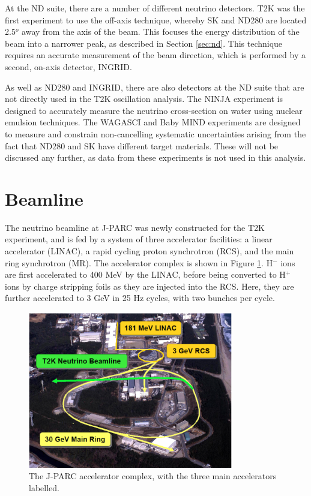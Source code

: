 At the ND suite, there are a number of different neutrino detectors. T2K was the first experiment to use the off-axis technique, whereby SK and ND280 are located 2.5$^o$ away from the axis of the beam. This focuses the energy distribution of the beam into a narrower peak, as described in Section \ref{sec:nd}. This technique requires an accurate measurement of the beam direction, which is performed by a second, on-axis detector, INGRID.

As well as ND280 and INGRID, there are also detectors at the ND suite that are not directly used in the T2K oscillation analysis. The NINJA\cite{ninja} experiment is designed to accurately measure the neutrino cross-section on water using nuclear emulsion techniques. The WAGASCI\cite{wagasci} and Baby MIND\cite{babymind} experiments are designed to measure and constrain non-cancelling systematic uncertainties arising from the fact that ND280 and SK have different target materials. These will not be discussed any further, as data from these experiments is not used in this analysis.

\section{Beamline}\label{sec:beam}

The neutrino beamline at J-PARC \cite{jparc} was newly constructed for the T2K experiment, and is fed by a system of three accelerator facilities: a linear accelerator (LINAC), a rapid cycling proton synchrotron (RCS), and the main ring synchrotron (MR). The accelerator complex is shown in Figure \ref{jparc}. H$^{-}$ ions are first accelerated to 400 MeV by the LINAC, before being converted to H$^{+}$ ions by charge stripping foils as they are injected into the RCS. Here, they are further accelerated to 3 GeV in 25 Hz cycles, with two bunches per cycle.

\begin{figure}[!htbp]
\centering
\includegraphics*[width=0.8\textwidth,clip]{figs/jparc}
\caption{The J-PARC accelerator complex, with the three main accelerators labelled.} \label{jparc}
\end{figure}

